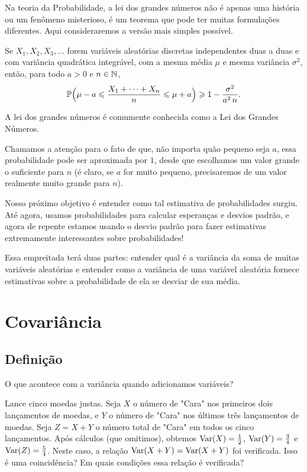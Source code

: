 Na teoria da Probabilidade, a lei dos grandes números não é apenas uma história ou um fenômeno misterioso, é um teorema que pode ter muitas formulações diferentes. Aqui consideraremos a versão mais simples possível.

\begin{theorem}
\label{thm:lln}
Se $ X_1, X_2, X_3, \dots $ forem variáveis aleatórias discretas independentes duas a duas e com variância quadrática integrável, com a mesma média $ \mu $ e mesma variância $ \sigma^2 $, então, para todo $ a>0 $ e $ n \in \mathbb{N} $,
\[
\mathbb{P}\Big( \mu-a \leqslant \frac{X_1+\dots+X_n}{n} \leqslant \mu+a \Big)
\geqslant
1 - \frac{\sigma^2}{a^2\, n}
.
\]
\end{theorem}

A lei dos grandes números é comumente conhecida como a Lei dos Grandes Números.

Chamamos a atenção para o fato de que, não importa quão pequeno seja $ a $, essa probabilidade pode ser aproximada por $ 1 $, desde que escolhamos um valor grande o suficiente para $ n $ (é claro, se $ a $ for muito pequeno, precisaremos de um valor realmente muito grande para $ n $).

Nosso próximo objetivo é entender como tal estimativa de probabilidades surgiu. Até agora, usamos probabilidades para calcular esperanças e desvios padrão, e agora de repente estamos usando o desvio padrão para fazer estimativas extremamente interessantes sobre probabilidades!

Essa empreitada terá duas partes: entender qual é a variância da soma de muitas variáveis aleatórias e entender como a variância de uma variável aleatória fornece estimativas sobre a probabilidade de ela se desviar de sua média.

\clearpage
\section{Covariância}
\label{sec:covariância}

\subsection{Definição}

O que acontece com a variância quando adicionamos variáveis?

\begin{example}
Lance cinco moedas justas. Seja $X$ o número de "Cara" nos primeiros dois lançamentos de moedas, e $Y$ o número de "Cara" nos últimos três lançamentos de moedas. Seja $Z = X+Y$ o número total de "Cara" em todos os cinco lançamentos. Após cálculos (que omitimos), obtemos $ \mathrm{Var}(X) = \frac{1}{2} $, $ \mathrm{Var}(Y) = \frac{3}{4} $ e $ \mathrm{Var}(Z) = \frac{5}{4} $. Neste caso, a relação $ \mathrm{Var}(X+Y) = \mathrm{Var}(X+Y) $ foi verificada. Isso é uma coincidência? Em quais condições essa relação é verificada?
\end{example}

